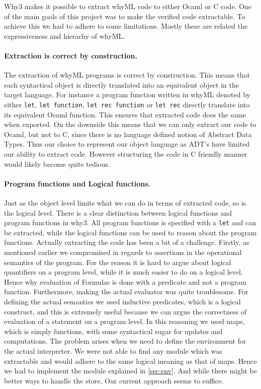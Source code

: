 Why3 makes it possible to extract whyML code to either Ocaml or C code.
One of the main goals of this project was to make the verified code extractable.
To achieve this we had to adhere to some limitations.
Mostly these are related the expressiveness and hierachy of whyML.

\paragraph{Extraction is correct by construction.}
The extraction of whyML programs is correct by construction\cite{TODO : manual for why3}.
This means that each syntactical object is directly translated into an equivalent object
in the target language. For instance a program function written in whyML denoted by either \texttt{let}, \texttt{let function}, \texttt{let rec function} or \texttt{let rec} directly translate into its equivalent Ocaml function. This ensures that extracted code does the same when exported.
On the downside this means that we can only extract our code to Ocaml, but not to C, since there is no
language defined notion of Abstract Data Types.
Thus our choice to represent our object language as ADT's have limited our ability to extract code.
However structuring the code in C friendly manner would likely become quite tedious.

\paragraph{Program functions and Logical functions.}
Just as the object level limits what we can do in terms of extracted code, so is the logical level.
There is a clear distinction between logical functions and program functions in why3.
All program functions is specified with a \texttt{let} and can be extracted,
while the logical functions can be used to reason about the program functions.
Actually extracting the code has been a bit of a challenge.
Firstly, as mentioned earlier we compromised in regards to assertions in the operational semantics of the program. For the reason it is hard to argue about logical quantifiers on a program level, while it is much easier to do on a logical level. Hence why evaluation of Formulas is done with a predicate and not a program function.
Furthermore, making the actual evaluator was quite troublesome.
For defining the actual semantics we used inductive predicates, which is a logical construct, and this is extremely useful because we can argue the correctness of evaluation of a statement on a program level.
In this reasoning we used maps, which is simply functions, with some syntactical sugar for updates and computations.
The problem arises when we need to define the environment for the actual interpreter. We were not able
to find any module which was extractable and would adhere to the same logical meaning as that of maps.
Hence we had to implement the module explained in \ref{sec:env}. And while there might be better ways to
handle the store, Our current approach seems to suffice.

